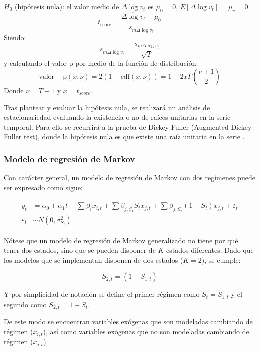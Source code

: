 \documentclass[titlepage, 12pt]{article}
\begin{document}
$H_0$ (hipótesis nula): el valor medio de $\Delta\log{v_t}$ es $\mu_0=0$, $E\left[\Delta\log{v_t}\right]=\mu_v=0$.
\begin{equation}
    t_{\mathrm{score}}=\frac{\overline{\Delta\log{v_t}}-\mu_0}{s_{m\overline{\Delta\log{v_t}}}}
\end{equation}
%
Siendo:
\[s_{m\overline{\Delta\log{v_t}}}=\frac{s_{m\Delta\log{v_t}}}{\sqrt T}\]
%
y calculando el valor p por medio de la función de distribución:
\[\mathrm{valor-p}\left(x,\nu\right)=2\left(1-\mathrm{cdf}\left(x,\nu\right)\right)=1-2x\Gamma\left(\frac{\nu+1}{2}\right)\]
%
Donde $\nu=T-1$ y $x=t_{score}$.

Tras plantear y evaluar la hipótesis nula, se realizará un análisis de estacionariedad evaluando la existencia o no de raíces unitarias en la serie temporal. Para ello se recurrirá a la prueba de Dickey Fuller (Augmented Dickey-Fuller test), donde la hipótesis nula es que existe una raíz unitaria en la serie \autocite{dickey1979}.

\subsubsection{Modelo de regresión de Markov}
Con carácter general, un modelo de regresión de Markov con dos regímenes puede ser expresado como sigue:

\begin{align}
    \begin{split}
        y_t           & =\alpha_0+\alpha_1t+\sum\beta_ix_{i,t}+\sum\beta_{j,S_1}S_tx_{j,t}+\sum{\beta_{j,S_2}\left(1-S_t\right)x_{j,t}}+\varepsilon_t \\
        \varepsilon_t & \sim N\left(0,\sigma_{S_t}^2\right)
    \end{split}
\end{align}

Nótese que un modelo de regresión de Markov generalizado no tiene por qué tener dos estados, sino que se pueden disponer de $K$ estados diferentes. Dado que los modelos que se implementan disponen de dos estados ($K=2$), se cumple:

\begin{equation}
    S_{2,t}=\left(1-S_{1,t}\right)
\end{equation}

Y por simplicidad de notación se define el primer régimen como $S_t=S_{1,t}$ y el segundo como $S_{2,t}=1-S_t$.

De este modo se encuentran variables exógenas que son modeladas cambiando de régimen ($x_{i,t}$), así como variables exógenas que no son modeladas cambiando de régimen ($x_{j,t}$).
\end{document}
